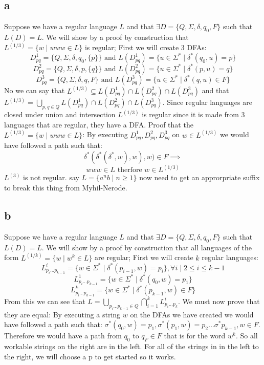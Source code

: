 \documentclass[12pt]{article}
\begin{document}
\subsection*{a}
Suppose we have a regular language $L$ and that $\exists    D = \{Q, \Sigma, \delta, q_0, F\}$ such that $L(D) = L$. We will show by a proof by construction that $L^{(1/3)} = \{ w \mid www \in L\}$ is regular; \newline First we will create 3 DFAs:
$$D^1_{pq} = \{Q, \Sigma, \delta, q_0, \{p\}\} \text{ and } L(D^1_{pq}) = \{u \in \Sigma^* \mid \delta^* (q_0,u) = p\}$$
$$D^2_{pq} = \{Q, \Sigma, \delta, p, \{q\}\} \text{ and } L(D^2_{pq}) = \{u \in \Sigma^* \mid \delta^* (p,u) = q\}$$
$$D^3_{pq} = \{Q, \Sigma, \delta, q, F\} \text{ and } L(D^3_{pq}) = \{u \in \Sigma^* \mid \delta^* (q,u) \in F\}$$
No we can say that $L^{(1/3)} \subseteq L(D^1_{pq}) \cap L(D^2_{pq}) \cap L(D^3_{pq})$ and that $L^{(1/3)} = \bigcup_{p,q \in Q}  L(D^1_{pq}) \cap L(D^2_{pq}) \cap L(D^3_{pq})$.  Since regular languages are closed under union and intersection $L^{(1/3)}$ is regular since it is made from 3 languages that are regular, they have a DFA. \newline
Proof that the $L^{(1/3)} = \{ w \mid www \in L\}$:\newline
By executing  $D^1_{pq} , D^2_{pq} , D^3_{pq}$ on $w \in L^{(1/3)}$ we would have followed a path such that:
$$\delta^*(\delta^*(\delta^*, w), w), w) \in F \implies$$
$$www \in L \text{ therfore }w \in L^{(1/3)}$$
\newline $L^{(3)}$ is not regular. say $L = \{a^nb \mid n \ge 1\}$ now need to get an approrpriate suffix to break this thing from Myhil-Nerode.
\subsection*{b}
Suppose we have a regular language $L$ and that $\exists    D = \{Q, \Sigma, \delta, q_0, F\}$ such that $L(D) = L$. We will show by a proof by construction that all languages of the form $L^{(1/k)} = \{ w \mid w^k \in L\}$ are regular;
\newline First we will create $k$ regular languages:
$$L^i_{p_i...p_{k-1}} = \{ w \in \Sigma^* \mid \delta^*(p_{i-1},w) = p_i\}, \forall i \mid 2 \le i \le k-1 $$
$$L^1_{p_i...p_{k-1}} = \{ w \in \Sigma^* \mid \delta^*(q_0,w) = p_1\}$$
$$L^k_{p_i...p_{k-1}} = \{ w \in \Sigma^* \mid \delta^*(p_{k-1},w) \in F\}$$
From this we can see that $L = \bigcup_{p_i...p_{k-1} \in Q} \bigcap^k_{i=1} L^i_{p_i...p_k}$. We must now prove that they are equal: \newline
By executing a string $w$ on the DFAs we have created we would have followed a path such that: $\sigma^*(q_0,w) = p_1 , \sigma^*(p_1, w) = p_2 ... \sigma^*{p_{k-1}, w} \in F$.  Therefore we would have a path from $q_0$ to $q_F \in F$ that is for the word $w^k$. So all workable strings on the right are in the left.
\newline For all of the strings in in the left to the right, we will choose a p to get started so it works.
\end{document}
